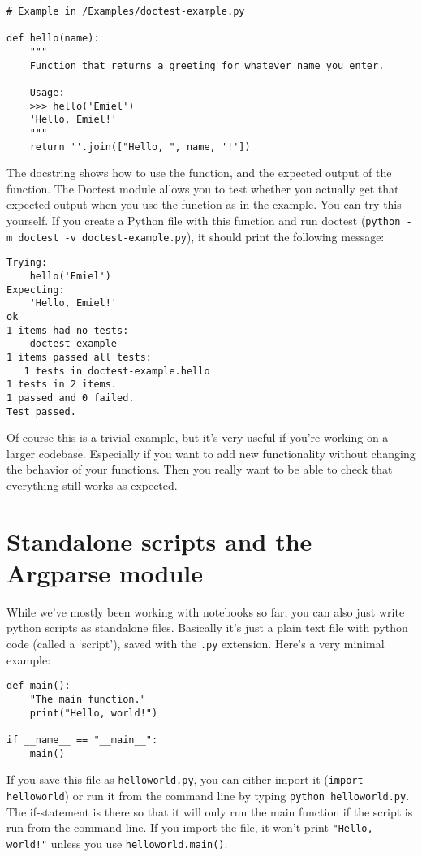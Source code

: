 \documentclass[12pt]{book}
\begin{document}
\begin{lstlisting}
# Example in /Examples/doctest-example.py

def hello(name):
    """
    Function that returns a greeting for whatever name you enter.

    Usage:
    >>> hello('Emiel')
    'Hello, Emiel!'
    """
    return ''.join(["Hello, ", name, '!'])
\end{lstlisting}

The docstring shows how to use the function, and the expected output of the function. The Doctest module allows you to test whether you actually get that expected output when you use the function as in the example. You can try this yourself. If you create a Python file with this function and run doctest (\texttt{python -m doctest -v doctest-example.py}), it should print the following message:

\begin{verbatim}
Trying:
    hello('Emiel')
Expecting:
    'Hello, Emiel!'
ok
1 items had no tests:
    doctest-example
1 items passed all tests:
   1 tests in doctest-example.hello
1 tests in 2 items.
1 passed and 0 failed.
Test passed.
\end{verbatim}

Of course this is a trivial example, but it's very useful if you're working on a larger codebase. Especially if you want to add new functionality without changing the behavior of your functions. Then you really want to be able to check that everything still works as expected.

\section{Standalone scripts and the Argparse module}

While we've mostly been working with notebooks so far, you can also just write python scripts as standalone files. Basically it's just a plain text file with python code (called a `script'), saved with the \texttt{.py} extension. Here's a very minimal example:

\begin{lstlisting}
def main():
    "The main function."
    print("Hello, world!")

if __name__ == "__main__":
    main()
\end{lstlisting}

If you save this file as \texttt{helloworld.py}, you can either import it (\texttt{import helloworld}) or run it from the command line by typing \texttt{python helloworld.py}. The if-statement is there so that it will only run the main function if the script is run from the command line. If you import the file, it won't print \texttt{"Hello, world!"} unless you use \texttt{helloworld.main()}.
\end{document}
